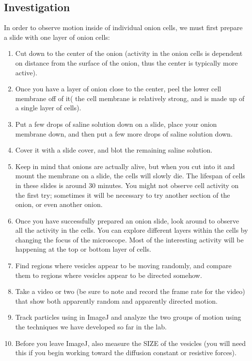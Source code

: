 \subsection*{Investigation}
In order to observe motion inside of individual onion cells, we must first prepare a slide with one layer of onion cells:
\begin{enumerate}
\item Cut down to the center of the onion (activity in the onion cells is dependent on distance from the surface of the onion, thus the center is typically more active). 
\item Once you have a layer of onion close to the center, peel the lower cell membrane off of it( the cell membrane is relatively strong, and is made up of a single layer of cells). 
\item Put a few drops of saline solution down on a slide, place your onion membrane down, and then put a few more drops of saline solution down. 
\item Cover it with a slide cover, and blot the remaining saline solution. 
\item Keep in mind that onions are actually alive, but when you cut into it and mount the membrane on a slide, the cells will slowly die. The lifespan of cells in these slides is around 30 minutes. You might not observe cell activity on the first try; sometimes it will be necessary to try another section of the onion, or even another onion. 
\item Once you have successfully prepared an onion slide, look around to observe all the activity in the cells. You can explore different layers within the cells by changing the focus of the microscope. Most of the interesting activity will be happening at the top or bottom layer of cells. 
\item Find regions where vesicles appear to be moving randomly, and compare them to regions where vesicles appear to be directed somehow. 
\item Take a video or two (be sure to note and record the frame rate for the video) that show both apparently random and apparently directed motion. 
\item Track particles using in ImageJ and analyze the two groups of motion using the techniques we have developed so far in the lab. 
\item Before you leave ImageJ, also measure the SIZE of the vesicles (you will need this if you begin working toward the diffusion constant or resistive forces).
\end{enumerate}

